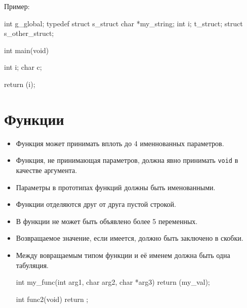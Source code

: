 \documentclass{42-ru}
\begin{document}
    \newpage

            Пример:
            \begin{42ccode}
int             g_global;
typedef struct  s_struct
{
    char    *my_string;
    int     i;
}               t_struct;
struct          s_other_struct;

int     main(void)
{
    int     i;
    char    c;

    return (i);
}
            \end{42ccode}

    \newpage


    \section{Функции}

        \begin{itemize}

            \item Функция может принимать вплоть до 4 именнованных параметров.

            \item Функция, не принимающая параметров, должна явно принимать \texttt{void} в качестве аргумента. 

            \item Параметры в прототипах функций должны быть именованными.

            \item Функции отделяются друг от друга пустой строкой.

            \item В функции не может быть объявлено более 5 переменных.

            \item Возвращаемое значение, если имеется, должно быть заключено в скобки. 

            \item Между вовращаемым типом функции и её именем должна быть одна табуляция.

            \begin{42ccode}
int my_func(int arg1, char arg2, char *arg3)
{
    return (my_val);
}

int func2(void)
{
    return ;
}
            \end{42ccode}

        \end{itemize}
\end{document}
